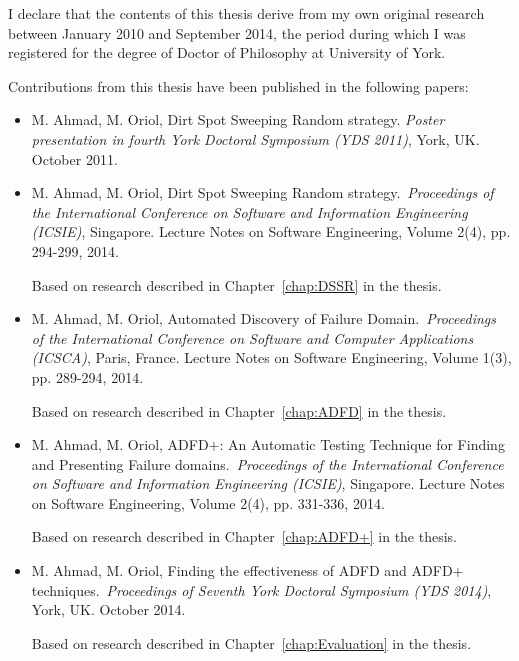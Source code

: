 \begin{declaration}

I declare that the contents of this thesis derive from my own original research between January 2010 and September 2014, the period during which I was registered for the degree of Doctor of Philosophy at University of York.

Contributions from this thesis have been published in the following papers: 

\begin{itemize}

\item M. Ahmad, M. Oriol, Dirt Spot Sweeping Random strategy. \textit{Poster presentation in fourth York Doctoral Symposium (YDS 2011)}, York, UK. October 2011.

\item M. Ahmad, M. Oriol, Dirt Spot Sweeping Random strategy.~\textit{Proceedings of the International Conference on Software and Information Engineering (ICSIE)}, Singapore. Lecture Notes on Software Engineering, Volume 2(4), pp. 294-299, 2014.

Based on research described in Chapter~\ref{chap:DSSR} in the thesis.\\

\item M. Ahmad, M. Oriol, Automated Discovery of Failure Domain.~\textit{Proceedings of the International Conference on Software and Computer Applications (ICSCA)}, Paris, France. Lecture Notes on Software Engineering, Volume 1(3), pp. 289-294, 2014.

Based on research described in Chapter~\ref{chap:ADFD} in the thesis.\\

\item M. Ahmad, M. Oriol, ADFD+: An Automatic Testing Technique for Finding and Presenting Failure domains.~\textit{Proceedings of the International Conference on Software and Information Engineering (ICSIE)}, Singapore. Lecture Notes on Software Engineering, Volume 2(4), pp. 331-336, 2014.

Based on research described in Chapter~\ref{chap:ADFD+} in the thesis.\\

\item M. Ahmad, M. Oriol, Finding the effectiveness of ADFD and ADFD+ techniques.~\textit{Proceedings of Seventh York Doctoral Symposium (YDS 2014)}, York, UK. October 2014.

Based on research described in Chapter~\ref{chap:Evaluation} in the thesis.

\end{itemize}

\end{declaration}